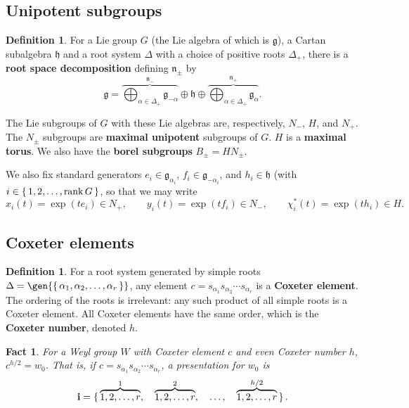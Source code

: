\documentclass{amsart}
\theoremstyle{plain}
\newtheorem{fact}[theorem]{Fact}
\theoremstyle{definition}
\newtheorem{definition}[theorem]{Definition}
\theoremstyle{remark}
\newcommand{\defined}[1]{\textbf{#1}}
\newcommand{\posroots}{\Delta_{+}}
\newcommand{\roots}{\Delta}
\newcommand{\torush}{\chi^{\ast}}
\newcommand{\word}[1]{\mathbf{#1}}
\DeclareMathOperator{\rank}{rank}
\DeclarePairedDelimiter\gen\langle\rangle
\begin{document}
  \subsection{Unipotent subgroups}

  \begin{definition}
    \label{def:root-space-decomposition}
    For a Lie group $G$ (the Lie algebra of which is $\mathfrak{g}$), a
    Cartan subalgebra $\mathfrak{h}$ and a root system $\roots$ with a
    choice of positive roots $\posroots$, there is a \defined{root space
      decomposition} defining $\mathfrak{n}_{\pm}$ by \[ \mathfrak{g} =
      \overbrace{\bigoplus_{\alpha \in \posroots}
        \mathfrak{g}_{-\alpha}}^{\mathfrak{n}_{-}} {}\oplus{}
      \mathfrak{h} \oplus \overbrace{\bigoplus_{\alpha \in \posroots}
        \mathfrak{g}_{\alpha}}^{\mathfrak{n}_{+}}. \]

    The Lie subgroups of $G$ with these Lie algebras are, respectively,
    $N_{-}$, $H$, and $N_{+}$. The $N_{\pm}$ subgroups are
    \defined{maximal unipotent} subgroups of $G$. $H$ is a
    \defined{maximal torus}. We also have the \defined{borel subgroups}
    $B_{\pm} = H N_{\pm}$.

    We also fix standard generators $e_i \in \mathfrak{g}_{\alpha_i}$,
    $f_i \in \mathfrak{g}_{- \alpha_i}$, and $h_i \in \mathfrak{h}$
    (with $i \in \set{1, 2, \dotsc, \rank G}$, so that we may write \[
      x_i(t) = \exp(t e_i) \in N_{+}, \qquad y_i(t) = \exp(t f_i) \in
      N_{-}, \qquad \torush_{i}(t) = \exp(t h_i) \in H. \]
  \end{definition}

  \subsection{Coxeter elements}

  \begin{definition}
    For a root system generated by simple roots $\roots =
    \gen{\set{\alpha_1, \alpha_2, \dotsc, \alpha_r}}$, any element $c =
    s_{\alpha_1} s_{\alpha_2} \dotsb s_{\alpha_r}$ is a \defined{Coxeter
      element}. The ordering of the roots is irrelevant: any such
    product of all simple roots is a Coxeter element. All Coxeter
    elements have the same order, which is the \defined{Coxeter number},
    denoted $h$.
  \end{definition}

  \begin{fact}
    \label{fac:w0-construction}
    For a Weyl group $W$ with Coxeter element $c$ and even Coxeter
    number $h$, $c^{h/2} = w_0$. That is, if $c = s_{\alpha_1}
    s_{\alpha_2} \dotsb s_{\alpha_r}$, a presentation for $w_0$ is \[
      \word{i} = \set{\overbrace{1, 2, \dotsc, r}^{1}, \quad
        \overbrace{1, 2, \dotsc, r}^{2}, \quad \dotsc, \quad
        \overbrace{1, 2, \dotsc, r}^{h/2}}. \]
  \end{fact}
\end{document}
